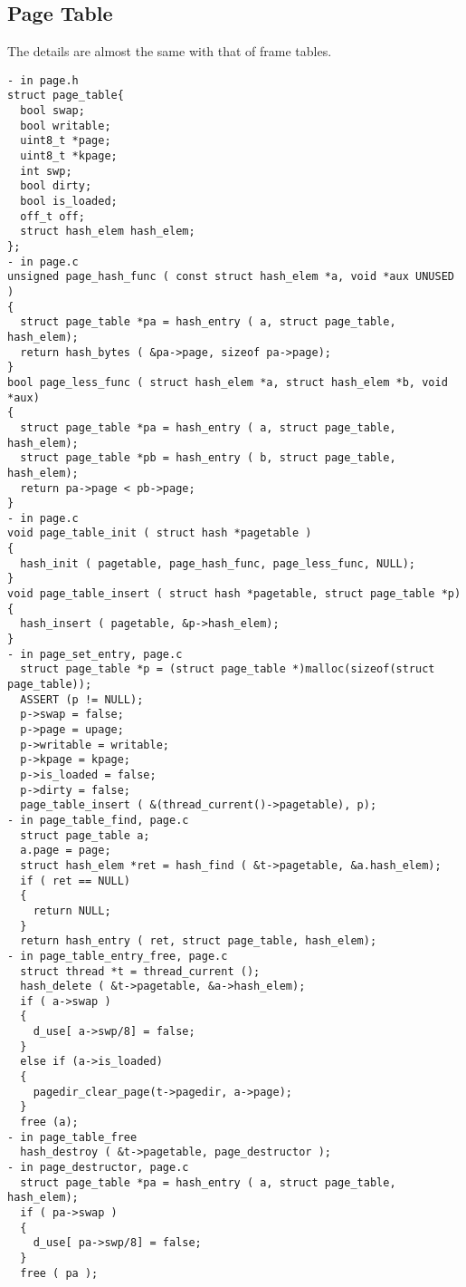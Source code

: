 \documentclass[a4paper,article,11pt,oneside]{article}
\begin{document}
\subsection{Page Table}
The details are almost the same with that of frame tables.
\begin{verbatim}
- in page.h
struct page_table{
  bool swap;
  bool writable;
  uint8_t *page;
  uint8_t *kpage;
  int swp;
  bool dirty;
  bool is_loaded;
  off_t off;
  struct hash_elem hash_elem;
};
- in page.c
unsigned page_hash_func ( const struct hash_elem *a, void *aux UNUSED )
{
  struct page_table *pa = hash_entry ( a, struct page_table, hash_elem);
  return hash_bytes ( &pa->page, sizeof pa->page);
}
bool page_less_func ( struct hash_elem *a, struct hash_elem *b, void *aux)
{
  struct page_table *pa = hash_entry ( a, struct page_table, hash_elem);
  struct page_table *pb = hash_entry ( b, struct page_table, hash_elem);
  return pa->page < pb->page;
}
- in page.c
void page_table_init ( struct hash *pagetable )
{
  hash_init ( pagetable, page_hash_func, page_less_func, NULL);
}
void page_table_insert ( struct hash *pagetable, struct page_table *p)
{
  hash_insert ( pagetable, &p->hash_elem);
}
- in page_set_entry, page.c
  struct page_table *p = (struct page_table *)malloc(sizeof(struct page_table));
  ASSERT (p != NULL);
  p->swap = false;
  p->page = upage;
  p->writable = writable;
  p->kpage = kpage;
  p->is_loaded = false;
  p->dirty = false;
  page_table_insert ( &(thread_current()->pagetable), p);
- in page_table_find, page.c
  struct page_table a;
  a.page = page;
  struct hash_elem *ret = hash_find ( &t->pagetable, &a.hash_elem);
  if ( ret == NULL)
  {
    return NULL;
  }
  return hash_entry ( ret, struct page_table, hash_elem); 
- in page_table_entry_free, page.c
  struct thread *t = thread_current ();
  hash_delete ( &t->pagetable, &a->hash_elem);
  if ( a->swap )
  {
    d_use[ a->swp/8] = false;
  } 
  else if (a->is_loaded) 
  {
    pagedir_clear_page(t->pagedir, a->page);
  }
  free (a);
- in page_table_free
  hash_destroy ( &t->pagetable, page_destructor );
- in page_destructor, page.c
  struct page_table *pa = hash_entry ( a, struct page_table, hash_elem);
  if ( pa->swap )
  {
    d_use[ pa->swp/8] = false;
  }
  free ( pa );
\end{verbatim}
\end{document}
